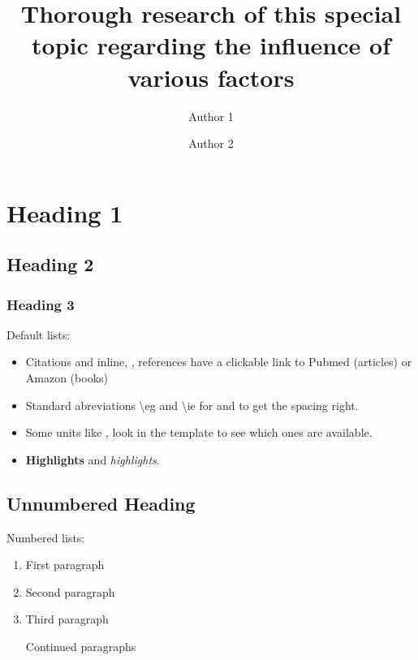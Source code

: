 \documentclass[pagesize,english,DIV=calc,footinclude=false
    ,DIV=14,twocolumn,fontsize=9pt
]{scrartcl}
\title{Thorough research of this special topic regarding the influence of
various factors}
\author{Author 1 \and Author 2}
\begin{document}
\maketitle


{
\hypersetup{linkcolor=black}
\setcounter{tocdepth}{2}
\tableofcontents
}

\section{Heading 1}\label{heading-1}

\subsection{Heading 2}\label{heading-2}

\subsubsection{Heading 3}\label{heading-3}

Default lists:

\begin{itemize}
\tightlist
\item
  Citations \autocite{Macherey2006} and inline,
  \eg \textcite{Macherey2006}, references have a clickable link to
  Pubmed (articles) or Amazon (books)
\item
  Standard abreviations \textbackslash{}eg and \textbackslash{}ie for
  \eg and \ie to get the spacing right.
\item
  Some units like , look in the template to see which ones are
  available.
\item
  \textbf{Highlights} and \emph{highlights}.
\end{itemize}

\subsection*{Unnumbered Heading}\label{unnumbered-heading}

Numbered lists:

\begin{enumerate}
\def\labelenumi{\arabic{enumi}.}
\item
  First paragraph
\item
  Second paragraph
\item
  Third paragraph

  Continued paragraphs
\end{enumerate}
\end{document}
